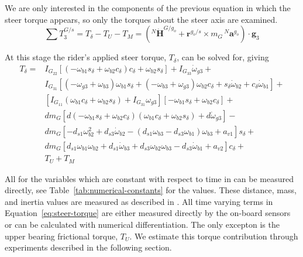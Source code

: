 \documentclass[10pt]{article}
\begin{document}
We are only interested in the components of the previous equation in which the
steer torque appears, so only the torques about the steer axis are examined.
%
\begin{equation}
  \sum T^{G/s}_3 = T_\delta - T_U - T_M = \left({}^N\dot{\mathbf{H}}^{G/g_o} +
  \mathbf{r}^{g_o/s} \times m_G\,{}^N\mathbf{a}^{g_o}\right) \cdot \hat{\mathbf{g}}_3
\end{equation}

At this stage the rider's applied steer torque, $T_\delta$, can be solved for,
giving
%
\begin{align}
  T_{\delta} =
    & I_{G_{22}} \left[ \left( -\omega_{b1} s_\delta + \omega_{b2} c_\delta \right)
      c_\delta + \omega_{b2} s_\delta \right] + I_{G_{33}} \dot{\omega}_{g3} + \nonumber \\
    & I_{G_{31}} \left[ (-\omega_{g3} + \omega_{b3} ) \omega_{b1} s_\delta +
      (-\omega_{b3} + \omega_{g3}) \omega_{b2} c_\delta +
      s_\delta \dot{\omega}_{b2} + c_\delta \dot{\omega}_{b1} \right] + \nonumber \\
    & \left[ I_{G_{11}} (\omega_{b1} c_\delta + \omega_{b2}s_\delta) +
      I_{G_{31}} \omega_{g3} \right] \left[-\omega_{b1} s_\delta +
      \omega_{b2} c_\delta \right] + \nonumber \\
    & d m_G \left[ d (-\omega_{b1} s_\delta + \omega_{b2} c_\delta)
      (\omega_{b1} c_\delta + \omega_{b2} s_\delta) + d \dot{\omega}_{g3} \right] - \nonumber \\
    & d m_G \left[-d_{s1} \omega_{b2}^{2} + d_{s3} \dot{\omega}_{b2} -
      (d_{s1} \omega_{b3} - d_{s3} \omega_{b1}) \omega_{b3} + a_{v1} \right] s_\delta + \nonumber \\
    & d m_G \left[d_{s1} \omega_{b1} \omega_{b2} + d_{s1} \dot{\omega}_{b3} +
      d_{s3} \omega_{b2} \omega_{b3} - d_{s3} \dot{\omega}_{b1} + a_{v2} \right]
      c_\delta + \nonumber \\
    & T_U + T_M
    \label{eq:steer-torque}
\end{align}

All for the variables which are constant with respect to time in can be
measured directly, see Table~\ref{tab:numerical-constants} for the values.
These distance, mass, and inertia values are measured as described in
\cite{Moore2012}. All time varying terms in Equation~\ref{eq:steer-torque} are
either measured directly by the on-board sensors or can be calculated with
numerical differentiation. The only excepton is the upper bearing frictional
torque, $T_U$. We estimate this torque contribution through experiments
described in the following section.
\end{document}
